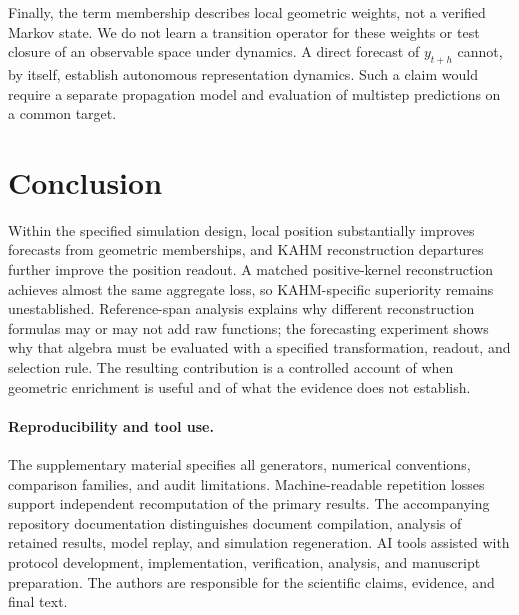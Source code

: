 Finally, the term membership describes local geometric weights, not a verified Markov state. We do not learn a transition operator for these weights or test closure of an observable space under dynamics. A direct forecast of $y_{t+h}$ cannot, by itself, establish autonomous representation dynamics. Such a claim would require a separate propagation model and evaluation of multistep predictions on a common target.

\section{Conclusion}
Within the specified simulation design, local position substantially improves forecasts from geometric memberships, and KAHM reconstruction departures further improve the position readout. A matched positive-kernel reconstruction achieves almost the same aggregate loss, so KAHM-specific superiority remains unestablished. Reference-span analysis explains why different reconstruction formulas may or may not add raw functions; the forecasting experiment shows why that algebra must be evaluated with a specified transformation, readout, and selection rule. The resulting contribution is a controlled account of when geometric enrichment is useful and of what the evidence does not establish.

\paragraph{Reproducibility and tool use.}
The supplementary material specifies all generators, numerical conventions, comparison families, and audit limitations. Machine-readable repetition losses support independent recomputation of the primary results. The accompanying repository documentation distinguishes document compilation, analysis of retained results, model replay, and simulation regeneration. AI tools assisted with protocol development, implementation, verification, analysis, and manuscript preparation. The authors are responsible for the scientific claims, evidence, and final text.
